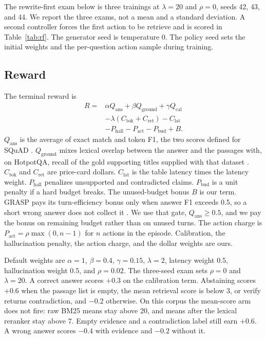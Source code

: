 \documentclass[letterpaper]{article} %
\begin{document}
The rewrite-first exam below is three trainings at \(\lambda{=}20\) and \(\rho{=}0\), seeds 42, 43, and 44. We report the three exams, not a mean and a standard deviation. A second controller forces the first action to be retrieve and is scored in Table~\ref{tab:rf}. The generator seed is temperature 0. The policy seed sets the initial weights and the per-question action sample during training.

\subsection{Reward}
The terminal reward is
\begin{equation}
\begin{aligned}
R = {} & \alpha Q_{\mathrm{ans}} + \beta Q_{\mathrm{ground}} + \gamma Q_{\mathrm{cal}} \\
& - \lambda (C_{\mathrm{tok}} + C_{\mathrm{ret}}) - C_{\mathrm{lat}} \\
& - P_{\mathrm{hall}} - P_{\mathrm{act}} - P_{\mathrm{bud}} + B.
\end{aligned}
\label{eq:reward}
\end{equation}
\(Q_{\mathrm{ans}}\) is the average of exact match and token F1, the two scores defined for SQuAD \cite{rajpurkar2016squad}. \(Q_{\mathrm{ground}}\) mixes lexical overlap between the answer and the passages with, on HotpotQA, recall of the gold supporting titles supplied with that dataset \cite{yang2018hotpotqa}. \(C_{\mathrm{tok}}\) and \(C_{\mathrm{ret}}\) are price-card dollars. \(C_{\mathrm{lat}}\) is the table latency times the latency weight. \(P_{\mathrm{hall}}\) penalizes unsupported and contradicted claims. \(P_{\mathrm{bud}}\) is a unit penalty if a hard budget breaks. The unused-budget bonus \(B\) is our term. GRASP pays its turn-efficiency bonus only when answer F1 exceeds 0.5, so a short wrong answer does not collect it \cite{gandhi2026grasp}. We use that gate, \(Q_{\mathrm{ans}} \ge 0.5\), and we pay the bonus on remaining budget rather than on unused turns. The action charge is \(P_{\mathrm{act}} = \rho \max(0, n-1)\) for \(n\) actions in the episode. Calibration, the hallucination penalty, the action charge, and the dollar weights are ours.

Default weights are \(\alpha{=}1\), \(\beta{=}0.4\), \(\gamma{=}0.15\), \(\lambda{=}2\), latency weight \(0.5\), hallucination weight \(0.5\), and \(\rho{=}0.02\). The three-seed exam sets \(\rho{=}0\) and \(\lambda{=}20\). A correct answer scores \(+0.3\) on the calibration term. Abstaining scores \(+0.6\) when the passage list is empty, the mean retrieval score is below 3, or verify returns contradiction, and \(-0.2\) otherwise. On this corpus the mean-score arm does not fire: raw BM25 means stay above 20, and means after the lexical reranker stay above 7. Empty evidence and a contradiction label still earn \(+0.6\). A wrong answer scores \(-0.4\) with evidence and \(-0.2\) without it.
\end{document}
